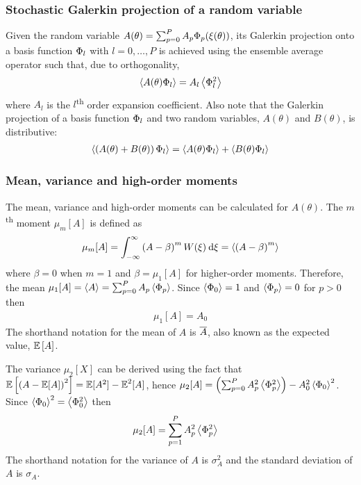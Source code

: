 \subsubsection*{Stochastic Galerkin projection of a random variable}
Given the random variable $A(\theta) = \sum_{p=0}^P A_p \Phi_p(\xi(\theta))$, its Galerkin projection onto a basis function $\Phi_l$ with $l = 0, \ldots, P$ is achieved using the ensemble average operator such that, due to orthogonality,
\begin{align}
	\left\langle A(\theta) \Phi_l \right\rangle = A_l \left\langle \Phi_l^2 \right\rangle \label{eqn:orthogonal}
\end{align}
where $A_l$ is the $l$\textsuperscript{th} order expansion coefficient.
Also note that the Galerkin projection of a basis function $\Phi_l$ and two random variables, $A(\theta)$ and $B(\theta)$, is distributive:
\begin{align}
	\left\langle \left(A(\theta) + B(\theta)\right) \Phi_l \right\rangle
	=
	\left\langle A(\theta) \Phi_l \right\rangle + \left\langle B(\theta) \Phi_l \right\rangle \label{eqn:distributive}
\end{align}

\subsubsection*{Mean, variance and high-order moments}
The mean, variance and high-order moments can be calculated for $A(\theta)$.
The $m$\textsuperscript{th} moment $\mu_m[A]$ is defined as
\begin{align}
\mu_m[A] = \int_{-\infty}^\infty \left(A - \beta \right)^m W(\xi) \:\mathrm{d} \xi
    =
    \left\langle \left( A - \beta \right)^m \right\rangle \label{eqn:moment}
\end{align}
where $\beta = 0$ when $m = 1$ and $\beta = \mu_1[A]$ for higher-order moments.
Therefore, the mean $\mu_1[A] = \left\langle A \right\rangle = \sum_{p=0}^P A_p \left\langle \Phi_p \right\rangle$.
Since $\left\langle \Phi_0 \right\rangle = 1$ and $\left\langle \Phi_p \right\rangle = 0$ for $p > 0$ then
\begin{align}
\mu_1[A] = A_0
\label{eqn:mean}
\end{align}
The shorthand notation for the mean of $A$ is $\overline{A}$, also known as the expected value, $\operatorname{\mathbb{E}}\left[A\right]$.

The variance $\mu_2[X]$ can be derived using the fact that $\operatorname{\mathbb{E}}\left[ \left( A - \operatorname{\mathbb{E}}[A] \right)^2 \right] = \operatorname{\mathbb{E}}[A^2] - \operatorname{\mathbb{E}}^2[A]$, hence $\mu_2[A] = \left(\sum_{p=0}^P A_p^2 \left\langle \Phi_p^2 \right\rangle\right) - A_0^2 \left\langle \Phi_0 \right\rangle^2$.
Since $\left\langle \Phi_0 \right\rangle^2 = \left\langle \Phi_0^2 \right\rangle$ then
\begin{align}
    \mu_2[A] &= \sum_{p=1}^P A^2_p \left\langle \Phi_p^2 \right\rangle \label{eqn:variance}
\end{align}
The shorthand notation for the variance of $A$ is $\sigma^2_A$ and the standard deviation of $A$ is $\sigma_A$.

